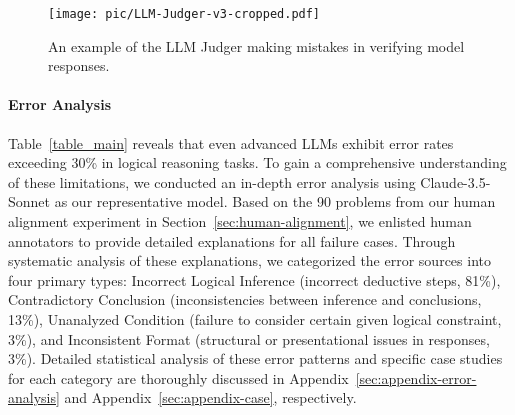 \begin{figure}[!htb]
  \centering
  \texttt{[image: pic/LLM-Judger-v3-cropped.pdf]}
  \caption{An example of the LLM Judger making mistakes in verifying model responses.}
  \label{fig:LLM-Judger}
\end{figure}

\paragraph{Error Analysis}
Table~\ref{table_main} reveals that even advanced LLMs exhibit error rates exceeding 30\% in logical reasoning tasks. To gain a comprehensive understanding of these limitations, we conducted an in-depth error analysis using Claude-3.5-Sonnet as our representative model. Based on the 90 problems from our human alignment experiment in Section~\ref{sec:human-alignment}, we enlisted human annotators to provide detailed explanations for all failure cases. Through systematic analysis of these explanations, we categorized the error sources into four primary types: Incorrect Logical Inference (incorrect deductive steps, 81\%), Contradictory Conclusion (inconsistencies between inference and conclusions, 13\%), Unanalyzed Condition (failure to consider certain given logical constraint, 3\%), and Inconsistent Format (structural or presentational issues in responses, 3\%). Detailed statistical analysis of these error patterns and specific case studies for each category are thoroughly discussed in Appendix~\ref{sec:appendix-error-analysis} and Appendix~\ref{sec:appendix-case}, respectively.


